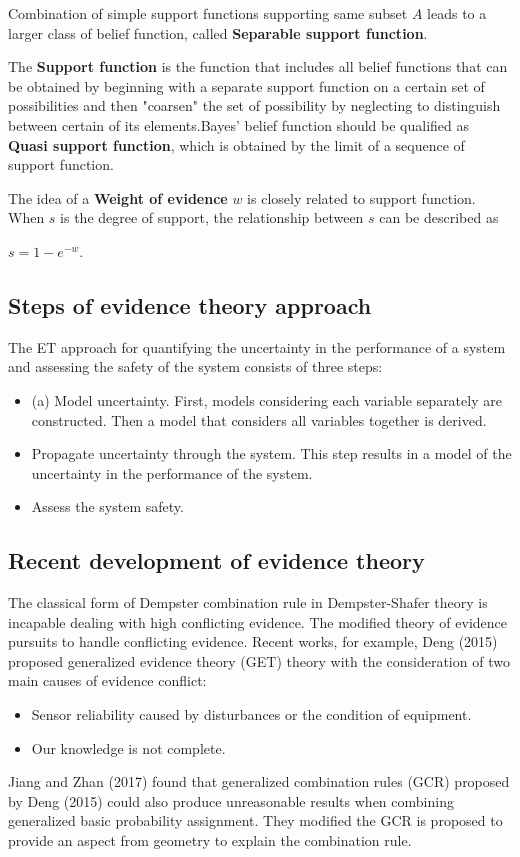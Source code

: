 \documentclass[11pt]{article}
\begin{document}
Combination of simple support functions supporting same subset \(A\) leads to a
larger class of belief function, called \textbf{Separable support function}. 

The \textbf{Support function} is the function that includes all belief functions that
can be obtained by beginning with a separate support function on a certain set
of possibilities and then "coarsen" the set of possibility by neglecting to
distinguish between certain of its elements.Bayes' belief function should be qualified as \textbf{Quasi support function}, which is
obtained by the limit of a sequence of support function.

The idea of a \textbf{Weight of evidence} \(w\) is closely related to support function. When
\(s\) is the degree of support, the relationship between \(s\) can be described as

\(s = 1-e^{-w}\).

\subsection{Steps of evidence theory approach}
\label{sec:orgf862c7f}

The ET approach for quantifying the uncertainty in the performance of a system
and assessing the safety of the system consists of three steps:
\begin{itemize}
\item (a) Model uncertainty. First, models considering each variable separately are
constructed. Then a model that considers all variables together is derived.
\item Propagate uncertainty through the system. This step results in a model of the
uncertainty in the performance of the system.
\item Assess the system safety.
\end{itemize}


\subsection{Recent development of evidence theory}
\label{sec:orgbe759a6}
The classical form of Dempster combination rule in Dempster-Shafer theory is
incapable dealing with high conflicting evidence. The modified theory of
evidence pursuits to handle conflicting evidence. Recent works, for example,
Deng (2015) proposed generalized evidence theory (GET) theory with the consideration of two
main causes of evidence conflict: 
\begin{itemize}
\item Sensor reliability caused by disturbances or the condition of equipment.
\item Our knowledge is not complete.
\end{itemize}
Jiang and Zhan (2017) found that generalized combination rules (GCR) proposed by
Deng (2015) could also produce unreasonable results when combining generalized
basic probability assignment. They modified the GCR is proposed to provide an
aspect from geometry to explain the combination rule.
\end{document}
